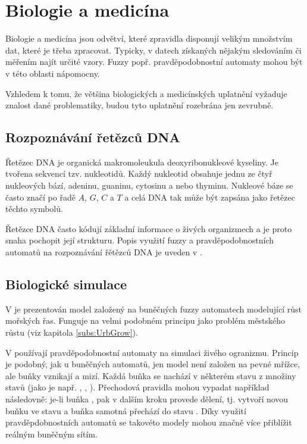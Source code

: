 \section{Biologie a medicína}

Biologie a medicína jsou odvětví, které zpravidla disponují velikým množstvím dat, které je třeba zpracovat. Typicky, v datech získaných nějakým sledováním či měřením najít určité vzory. Fuzzy popř. pravděpodobnostní automaty mohou být v této oblasti nápomocny.

Vzhledem k tomu, že většina biologických a medicínských uplatnění vyžaduje znalost dané problematiky, budou tyto uplatnění rozebrána jen zevrubně.

\subsection{Rozpoznávání řetězců DNA} \label{subs:DNA}
Řetězec DNA je organická makromoleukula deoxyribonukleové kyseliny. Je tvořena sekvencí tzv. nukleotidů. Každý nukleotid obsahuje jednu ze čtyř nukleových bází, adeninu, guaninu, cytosinu a nebo thyminu. Nukleové báze se často značí po řadě $A$, $G$, $C$ a $T$ a celá DNA tak může být zapsána jako řetězec těchto symbolů.

Řetězce DNA často kódují základní informace o živých organizmech a je proto snaha pochopit její strukturu. Popis využití fuzzy a pravděpodobnostních automatů na rozpoznávání řětězců DNA je uveden v \cite{SnaKepAbrHas-AproxStriMatchFuzzAut, Ron-AutLeaApp, ZlaSteSch-FiStaConTraFemPro, Her-ProAriAutAppSoComFraBioSeqAna}.

\subsection{Biologické simulace}
V \cite{CheMyn-ModAlgBloDutCosWat+} je prezentován model založený na buněčných fuzzy automatech modelující růst mořských řas. Funguje na velmi podobném principu jako problém městského růstu (viz kapitola \ref{subs:UrbGrow}).

V \cite{MilAtl-ProAuModEpiCelNet} používají pravděpodobnostní automaty na simulaci živého ogranizmu. Princip je podobný, jak u buněčných automatů, jen model není založen na pevné mřížce, ale buňky vznikají a mizí. Každá buňka se nachází v některém stavu z množiny stavů (jako je např. , , ). Přechodová pravidla mohou vypadat například následovně: je-li buňka , pak v dalším kroku provede dělení, tj. vytvoří novou buňku ve stavu  a buňka samotná přechází do stavu . Díky využití pravděpdobnostních automatů se takovéto modely mohou značně více přiblížit reálným buněčným sítím.

